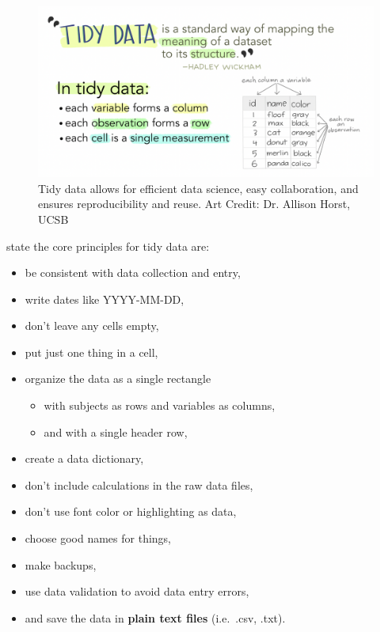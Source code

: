 \documentclass[
]{book}
\providecommand{\tightlist}{%
  \setlength{\itemsep}{0pt}\setlength{\parskip}{0pt}}
\begin{document}
\begin{figure}

{\centering \includegraphics[width=0.9\linewidth]{images/tidydata_horst} 

}

\caption{Tidy data allows for efficient data science, easy collaboration, and ensures reproducibility and reuse. Art Credit: Dr. Allison Horst, UCSB}\label{fig:tidydata}
\end{figure}

\citet{Broman_2018} state the core principles for tidy data are:

\begin{itemize}
\tightlist
\item
  be consistent with data collection and entry,
\item
  write dates like YYYY-MM-DD,
\item
  don't leave any cells empty,
\item
  put just one thing in a cell,
\item
  organize the data as a single rectangle

  \begin{itemize}
  \tightlist
  \item
    with subjects as rows and variables as columns,
  \item
    and with a single header row,
  \end{itemize}
\item
  create a data dictionary,
\item
  don't include calculations in the raw data files,
\item
  don't use font color or highlighting as data,
\item
  choose good names for things,
\item
  make backups,
\item
  use data validation to avoid data entry errors,
\item
  and save the data in \textbf{plain text files} (i.e.~.csv, .txt).
\end{itemize}
\end{document}
